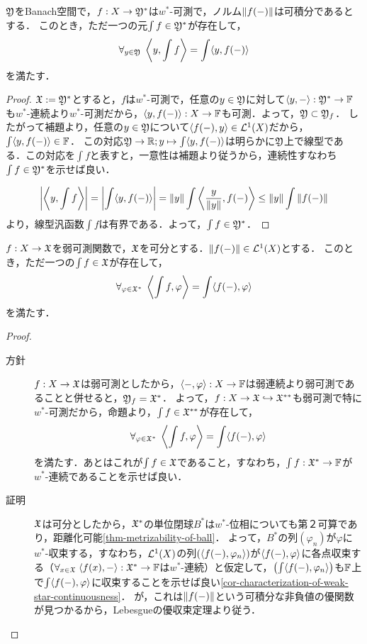 \documentclass[uplatex,dvipdfmx]{jsreport}
\begin{document}
\begin{proposition}
    $\mathfrak{Y}$をBanach空間で，$f:X\to\mathfrak{Y}^*$は$w^*$-可測で，ノルム$\|f(-)\|$は可積分であるとする．
    このとき，ただ一つの元$\int f\in\mathfrak{Y}^*$が存在して，
    \[\forall_{y\in\mathfrak{Y}}\;\left\langle y,\int f\right\rangle=\int\langle y,f(-)\rangle\]
    を満たす．
\end{proposition}
\begin{proof}
    $\mathfrak{X}:=\mathfrak{Y}^*$とすると，$f$は$w^*$-可測で，任意の$y\in\mathfrak{Y}$に対して$\langle y,-\rangle:\mathfrak{Y}^*\to\mathbb{F}$も$w^*$-連続より$w^*$-可測だから，$\langle y,f(-)\rangle:X\to\mathbb{F}$も可測．よって，$\mathfrak{Y}\subset\mathfrak{Y}_f$．
    したがって補題より，任意の$y\in\mathfrak{Y}$について$\langle f(-),y\rangle\in\mathcal{L}^1(X)$だから，$\int\langle y,f(-)\rangle\in\mathbb{F}$．
    この対応$\mathfrak{Y}\to\mathbb{R};y\mapsto\int\langle y,f(-)\rangle$は明らかに$\mathfrak{Y}$上で線型である．この対応を$\int f$と表すと，一意性は補題より従うから，連続性すなわち$\int f\in\mathfrak{Y}^*$を示せば良い．

    \[\left|\left\langle y,\int f\right\rangle\right|=\left|\int\langle y,f(-)\rangle\right|=\|y\|\int\left\langle\frac{y}{\|y\|},f(-)\right\rangle\le\|y\|\int\|f(-)\|\]
    より，線型汎函数$\int f$は有界である．よって，$\int f\in\mathfrak{Y}^*$．
\end{proof}

\begin{proposition}
    $f:X\to\mathfrak{X}$を弱可測関数で，$\mathfrak{X}$を可分とする．$\|f(-)\|\in\mathcal{L}^1(X)$とする．
    このとき，ただ一つの$\int f\in\mathfrak{X}$が存在して，
    \[\forall_{\varphi\in\mathfrak{X}^*}\;\left\langle\int f,\varphi\right\rangle=\int\langle f(-),\varphi\rangle\]
    を満たす．
\end{proposition}
\begin{proof}\mbox{}
    \begin{description}
        \item[方針] $f:X\to\mathfrak{X}$は弱可測としたから，$\langle-,\varphi\rangle:X\to\mathbb{F}$は弱連続より弱可測であることと併せると，$\mathfrak{Y}_f=\mathfrak{X}^*$．
        よって，$f:X\to\mathfrak{X}\hookrightarrow\mathfrak{X}^{**}$も弱可測で特に$w^*$-可測だから，命題より，$\int f\in\mathfrak{X}^{**}$が存在して，
        \[\forall_{\varphi\in\mathfrak{X}^*}\;\left\langle\int f,\varphi\right\rangle=\int\langle f(-),\varphi\rangle\]
        を満たす．あとはこれが$\int f\in\mathfrak{X}$であること，すなわち，$\int f:\mathfrak{X}^*\to\mathbb{F}$が$w^*$-連続であることを示せば良い．
        \item[証明] 
        $\mathfrak{X}$は可分としたから，$\mathfrak{X}^*$の単位閉球$B^*$は$w^*$-位相についても第２可算であり，距離化可能\ref{thm-metrizability-of-ball}．
        よって，$B^*$の列$(\varphi_n)$が$\varphi$に$w^*$-収束する，すなわち，$\mathcal{L}^1(X)$の列$(\langle f(-),\varphi_n\rangle)$が$\langle f(-),\varphi\rangle$に各点収束する（$\forall_{x\in\mathfrak{X}}\;\langle f(x),-\rangle:\mathfrak{X}^*\to\mathbb{F}$は$w^*$-連続）と仮定して，$\left(\int\langle f(-),\varphi_n\rangle\right)$も$\mathbb{F}$上で$\int\langle f(-),\varphi\rangle$に収束することを示せば良い\ref{cor-characterization-of-weak-star-continuousness}．
        が，これは$\|f(-)\|$という可積分な非負値の優関数が見つかるから，Lebesgueの優収束定理より従う．
    \end{description}
\end{proof}
\end{document}
